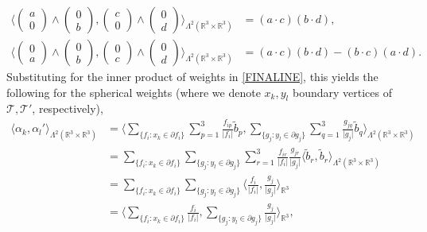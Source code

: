 \documentclass[sn-mathphys-num]{sn-jnl}%
\theoremstyle{thmstyleone}%
\theoremstyle{thmstyletwo}%
\theoremstyle{thmstylethree}%
\numberwithin{remark}{section}
\numberwithin{definition}{section}
\numberwithin{equation}{section}
\numberwithin{theorem}{section}
\newcommand{\R}{\ensuremath{\mathbb{R}}}%
\begin{document}
\begin{align*}
      \bigg\langle \begin{pmatrix} a \\ 0  \end{pmatrix}\wedge \begin{pmatrix} 0 \\ b  \end{pmatrix} ,\begin{pmatrix} c \\ 0  \end{pmatrix} \wedge \begin{pmatrix} 0 \\ d  \end{pmatrix}   \bigg\rangle_{\Lambda^{2}(\R^{3}\times \R^{3})}& = (a\cdot c)(b\cdot d),\\
    \bigg\langle \begin{pmatrix} 0 \\ a  \end{pmatrix}\wedge \begin{pmatrix} 0 \\ b  \end{pmatrix},\begin{pmatrix} 0 \\ c  \end{pmatrix} \wedge \begin{pmatrix} 0 \\ d  \end{pmatrix}  \bigg\rangle_{\Lambda^{2}(\R^{3}\times \R^{3})}&=(a\cdot c)(b\cdot d) - (b\cdot c)(a\cdot d). 
\end{align*}
Substituting for the inner product of weights in \cref{FINALINE}, this yields the following for the spherical weights (where we denote $x_{k},y_{l}$ boundary vertices of $\mathcal{T},\mathcal{T}'$, respectively),
\begin{align*}
    \langle \alpha_{k},\alpha_{l}' \rangle_{\Lambda^{2}(\R^{3}\times \R^{3})}
    &= \bigg\langle \sum_{\{f_{i}\colon x_k\in \partial f_i\}}\sum_{p=1}^{3}{\frac{f_{ip}}{\lvert f_{i} \rvert} }\tilde{b}_{p}, \sum_{\{g_{j}\colon y_l\in \partial g_j\}}\sum_{q=1}^{3}{\frac{g_{jq}}{\lvert g_{j} \rvert} }\tilde{b}_{q}\bigg\rangle_{\Lambda^{2}(\R^{3}\times \R^{3})} \\
    &= \sum_{\{f_i\colon x_k\in \partial f_i\}}
    \sum_{\{g_j\colon  y_{l}\in \partial g_j\}}\sum_{r=1}^{3}{\frac{f_{ir}}{\lvert f_{i} \rvert} }{\frac{g_{jr}}{\lvert g_{j} \rvert} }\langle \tilde{b}_{r},\tilde{b}_{r}\rangle_{\Lambda^{2}(\R^{3}\times \R^{3})}\\
&=    \sum_{\{f_i\colon x_k\in \partial f_i\}}
    \sum_{\{g_j\colon  y_{l}\in \partial g_j\}}{\bigg\langle \frac{f_{i}}{\lvert f_{i} \rvert},\frac{g_{j}}{\lvert g_{j} \rvert} \bigg\rangle_{\R^{3}}}\\&=   \bigg\langle \sum_{\{f_{i}\colon x_k \in \partial f_i\}}{ \frac{f_{i}}{\lvert f_{i} \rvert} },\sum_{\{g_{j}\colon y_l\in \partial g_j\}}{\frac{g_{j}}{\lvert g_{j} \rvert}} \bigg\rangle_{\R^{3}},
\end{align*}
\end{document}

